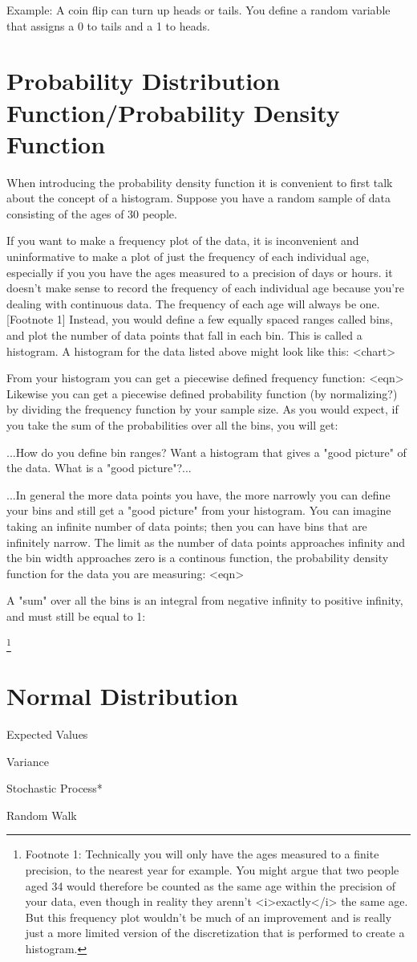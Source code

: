 \documentclass{article}
\begin{document}
Example:   A coin flip can turn up heads or tails.  You define a random variable that assigns a 0 to tails and a 1 to heads.


\section{Probability Distribution Function/Probability Density Function}

When introducing the probability density function it is convenient to first talk about the concept of a histogram.  Suppose you have a random sample of data consisting of the ages of 30 people. 


If you want to make a frequency plot of the data, it is inconvenient and uninformative to make a plot of just the frequency of each individual age, especially if you you have the ages measured to a precision of days or hours.  it doesn't make sense to record the frequency of each individual age because you're dealing with continuous data.  The frequency of each age will always be one. [Footnote 1]  Instead, you would define a few equally spaced ranges called bins, and plot the number of data points that fall in each bin.  This is called a histogram.  A histogram for the data listed above might look like this:  <chart>


From your histogram you can get a piecewise defined frequency function:  <eqn>  Likewise you can get a piecewise defined probability function (by normalizing?) by dividing the frequency function by your sample size. As you would expect, if you take the sum of the probabilities over all the bins, you will get: %


...How do you define bin ranges? Want a histogram that gives a "good picture" of the data.  What is a "good picture"?...


...In general the more data points you have, the more narrowly you can define your bins and still get a "good picture" from your histogram.  You can imagine taking an infinite number of data points; then you can have bins that are infinitely narrow.  The limit as the number of data points approaches infinity and the bin width approaches zero is a continous function, the probability density function for the data you are measuring: <eqn>

A "sum" over all the bins is an integral from negative infinity to positive infinity, and must still be equal to 1: %


\footnote{Footnote 1: Technically you will only have the ages measured to a finite precision, to the nearest year for example.  You might argue that two people aged 34 would therefore be counted as the same age within the precision of your data, even though in reality they arenn't <i>exactly</i> the same age.  But this frequency plot wouldn't be much of an improvement and is really just a more limited version of the discretization that is performed to create a histogram.}


\section{Normal Distribution}


Expected Values


Variance


Stochastic Process*

Random Walk
\end{document}
